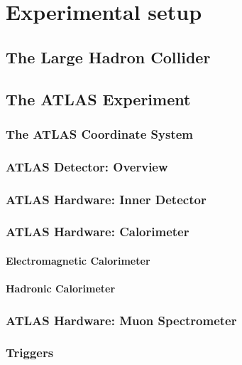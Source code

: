 \chapter{Experimental setup}
\label{Experiment}

\section{The Large Hadron Collider}
\label{Sec:LHC}

\section{The ATLAS Experiment}
\label{Sec:ATLAS}

\subsection{The ATLAS Coordinate System}

\subsection{ATLAS Detector: Overview}

\subsection{ATLAS Hardware: Inner Detector}

\subsection{ATLAS Hardware: Calorimeter}

\subsubsection{Electromagnetic Calorimeter}
\label{EMCalo} 

\subsubsection{Hadronic Calorimeter}
\label{Had}

\subsection{ATLAS Hardware: Muon Spectrometer}

\subsection{Triggers}
\label{Trig}
